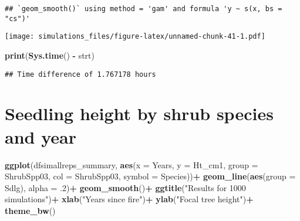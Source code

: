 \documentclass[]{article}
\newenvironment{Shaded}{\begin{snugshade}}{\end{snugshade}}
\newcommand{\KeywordTok}[1]{\textcolor[rgb]{0.13,0.29,0.53}{\textbf{#1}}}
\newcommand{\DataTypeTok}[1]{\textcolor[rgb]{0.13,0.29,0.53}{#1}}
\newcommand{\DecValTok}[1]{\textcolor[rgb]{0.00,0.00,0.81}{#1}}
\newcommand{\StringTok}[1]{\textcolor[rgb]{0.31,0.60,0.02}{#1}}
\newcommand{\OperatorTok}[1]{\textcolor[rgb]{0.81,0.36,0.00}{\textbf{#1}}}
\newcommand{\NormalTok}[1]{#1}
\begin{document}
\begin{verbatim}
## `geom_smooth()` using method = 'gam' and formula 'y ~ s(x, bs = "cs")'
\end{verbatim}

\texttt{[image: simulations\_files/figure-latex/unnamed-chunk-41-1.pdf]}

\begin{Shaded}
\begin{Highlighting}[]
\KeywordTok{print}\NormalTok{(}\KeywordTok{Sys.time}\NormalTok{() }\OperatorTok{-}\StringTok{ }\NormalTok{strt)}
\end{Highlighting}
\end{Shaded}

\begin{verbatim}
## Time difference of 1.767178 hours
\end{verbatim}

\section{Seedling height by shrub species and
year}\label{seedling-height-by-shrub-species-and-year}

\begin{Shaded}
\end{Shaded}

\begin{Shaded}
\begin{Highlighting}[]
\KeywordTok{ggplot}\NormalTok{(dfsimallreps_summary, }\KeywordTok{aes}\NormalTok{(}\DataTypeTok{x =}\NormalTok{ Years, }\DataTypeTok{y =}\NormalTok{ Ht_cm1, }\DataTypeTok{group =}\NormalTok{ ShrubSpp03, }\DataTypeTok{col =}\NormalTok{ ShrubSpp03, }\DataTypeTok{symbol =}\NormalTok{ Species))}\OperatorTok{+}
\StringTok{  }\KeywordTok{geom_line}\NormalTok{(}\KeywordTok{aes}\NormalTok{(}\DataTypeTok{group =}\NormalTok{ Sdlg), }\DataTypeTok{alpha =}\NormalTok{ .}\DecValTok{2}\NormalTok{)}\OperatorTok{+}
\StringTok{  }\KeywordTok{geom_smooth}\NormalTok{()}\OperatorTok{+}
\StringTok{  }\KeywordTok{ggtitle}\NormalTok{(}\StringTok{"Results for 1000 simulations"}\NormalTok{)}\OperatorTok{+}
\StringTok{  }\KeywordTok{xlab}\NormalTok{(}\StringTok{"Years since fire"}\NormalTok{)}\OperatorTok{+}
\StringTok{  }\KeywordTok{ylab}\NormalTok{(}\StringTok{"Focal tree height"}\NormalTok{)}\OperatorTok{+}
\StringTok{  }\KeywordTok{theme_bw}\NormalTok{()}
\end{Highlighting}
\end{Shaded}
\end{document}
